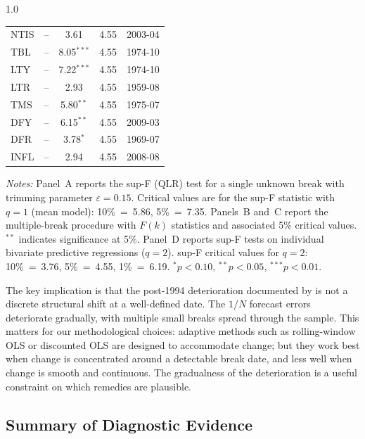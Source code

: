 \documentclass[a4paper,11pt]{article}
\begin{document}
\begin{spacing}{1.0}
\begin{table}[H]
\begin{tabular}{@{}lcccl@{}}
NTIS  & {--} &  3.61            & 4.55 & 2003-04 \\
TBL   & {--} &  8.05{$^{***}$} & 4.55 & 1974-10 \\
LTY   & {--} &  7.22{$^{***}$} & 4.55 & 1974-10 \\
LTR   & {--} &  2.93            & 4.55 & 1959-08 \\
TMS   & {--} &  5.80{$^{**}$}  & 4.55 & 1975-07 \\
DFY   & {--} &  6.15{$^{**}$}  & 4.55 & 2009-03 \\
DFR   & {--} &  3.78{$^{*}$}   & 4.55 & 1969-07 \\
INFL  & {--} &  2.94            & 4.55 & 2008-08 \\
\bottomrule
\end{tabular}
\vspace{0.4em}
\begin{minipage}{0.95\textwidth}
\footnotesize
\textit{Notes:} Panel~A reports the \citet{Andrews1993} sup-F (QLR) test for
a single unknown break with trimming parameter $\varepsilon = 0.15$.
Critical values are for the sup-F statistic with $q=1$ (mean model):
10\%~=~5.86, 5\%~=~7.35. Panels~B and~C report the \citet{BaiPerron2003}
multiple-break procedure with $F(k)$ statistics and associated 5\%
critical values. $^{**}$ indicates significance at 5\%.
Panel~D reports sup-F tests on individual bivariate predictive regressions
($q = 2$). sup-F critical values for $q = 2$: 10\%~=~3.76,
5\%~=~4.55, 1\%~=~6.19.
$^{*}\!p < 0.10$, $^{**}\!p < 0.05$, $^{***}\!p < 0.01$.
\end{minipage}
\end{table}
\end{spacing}

The key implication is that the post-1994 deterioration documented by
\citet{denkloffler2024} is not a discrete structural shift at a
well-defined date. The $1/N$ forecast errors deteriorate gradually,
with multiple small breaks spread through the sample. This matters for
our methodological choices: adaptive methods such as rolling-window OLS
or discounted OLS are designed to accommodate change; but they work
best when change is concentrated around a detectable break date, and
less well when change is smooth and continuous. The gradualness of the
deterioration is a useful constraint on which remedies are plausible.

\subsection{Summary of Diagnostic Evidence}\label{subsec:decomp-summary}
\end{document}
